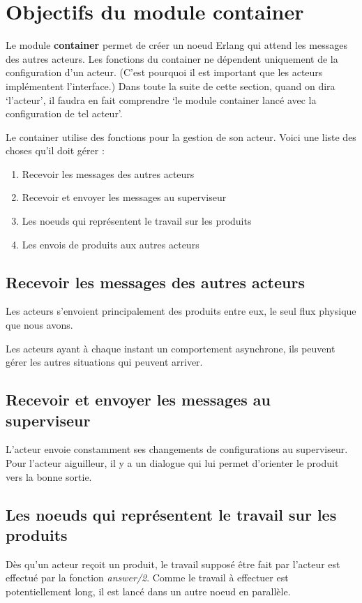 \documentclass[12pt,a4paper]{article}
\begin{document}
	\section{Objectifs du module container}
		Le module \textbf{container} permet de créer un noeud Erlang qui 
		attend les messages des autres acteurs. Les fonctions du container
		ne dépendent uniquement de la configuration d'un acteur. (C'est pourquoi
		il est important que les acteurs implémentent l'interface.)
		Dans toute la suite de cette section, quand on dira `l'acteur', 
		il faudra en fait comprendre `le module container lancé avec la 
		configuration de tel acteur'.

		Le container utilise des fonctions pour la gestion de son acteur. Voici 
		une liste des choses qu'il doit gérer :

		\begin{enumerate}
			\item Recevoir les messages des autres acteurs
			\item Recevoir et envoyer les messages au superviseur
			\item Les noeuds qui représentent le travail sur les produits
			\item Les envois de produits aux autres acteurs
		\end{enumerate}

		\subsection{Recevoir les messages des autres acteurs}
			Les acteurs s'envoient principalement des produits entre eux, le 
			seul flux physique que nous avons.
			
			Les acteurs ayant à chaque instant un comportement asynchrone, 
			ils peuvent gérer les autres situations qui peuvent arriver.

		\subsection{Recevoir et envoyer les messages au superviseur}
			L'acteur envoie constamment ses changements de configurations
			au superviseur. Pour l'acteur aiguilleur, il y a un dialogue
			qui lui permet d'orienter le produit vers la bonne sortie.

		\subsection{Les noeuds qui représentent le travail sur les produits}
			Dès qu'un acteur reçoit un produit, le travail supposé être fait
			par l'acteur est effectué par la fonction \textit{answer/2}. Comme
			le travail à effectuer est potentiellement long, il est lancé
			dans un autre noeud en parallèle.
\end{document}
